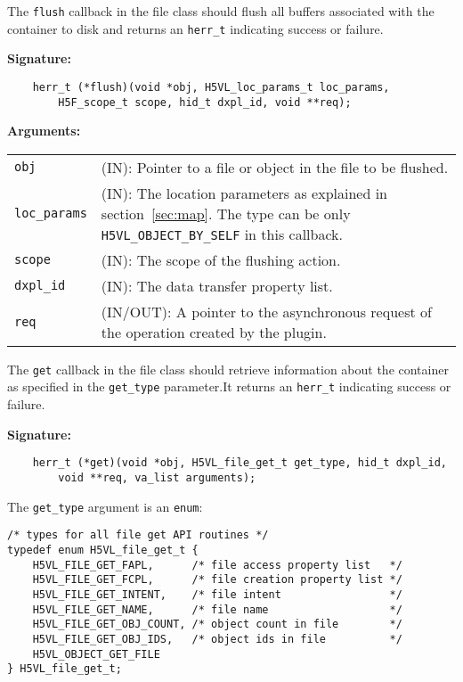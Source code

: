 The {\tt flush} callback in the file class should flush all buffers
associated with the container to disk and returns an {\tt herr\_t}
indicating success or failure.

\textbf{Signature:}
\begin{lstlisting}
    herr_t (*flush)(void *obj, H5VL_loc_params_t loc_params, 
        H5F_scope_t scope, hid_t dxpl_id, void **req);
\end{lstlisting}

\textbf{Arguments:}\\
\begin{tabular}{l p{10cm}}
  {\tt obj} & (IN): Pointer to a file or object in the file to be flushed.\\
  {\tt loc\_params} & (IN): The location parameters as explained in
  section~\ref{sec:map}. The type can be only {\tt
    H5VL\_OBJECT\_BY\_SELF} in this callback. \\
  {\tt scope} & (IN): The scope of the flushing action.\\
  {\tt dxpl\_id} & (IN): The data transfer property list.\\
  {\tt req} & (IN/OUT): A pointer to the asynchronous request of the
  operation created by the plugin.\\
\end{tabular}

The {\tt get} callback in the file class should retrieve
information about the container as specified in the {\tt get\_type}
parameter.It returns an {\tt herr\_t} indicating success or failure.

\textbf{Signature:}
\begin{lstlisting}
    herr_t (*get)(void *obj, H5VL_file_get_t get_type, hid_t dxpl_id, 
        void **req, va_list arguments);
\end{lstlisting}

The {\tt get\_type} argument is an {\tt enum}:
\begin{lstlisting}
/* types for all file get API routines */
typedef enum H5VL_file_get_t {
    H5VL_FILE_GET_FAPL,      /* file access property list   */
    H5VL_FILE_GET_FCPL,      /* file creation property list */
    H5VL_FILE_GET_INTENT,    /* file intent                 */
    H5VL_FILE_GET_NAME,      /* file name                   */
    H5VL_FILE_GET_OBJ_COUNT, /* object count in file        */
    H5VL_FILE_GET_OBJ_IDS,   /* object ids in file          */
    H5VL_OBJECT_GET_FILE
} H5VL_file_get_t;
\end{lstlisting}

